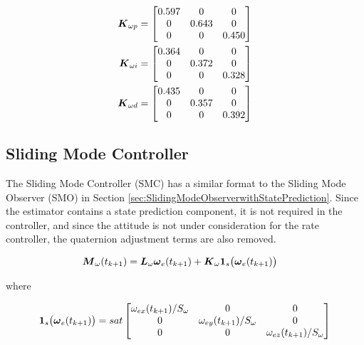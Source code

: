 \begin{subequations}
  \begin{align}
    \boldsymbol{K}_{\omega p} &= \begin{bmatrix} 0.597 & 0 & 0 \\ 0 & 0.643 & 0 \\ 0 & 0 & 0.450 \end{bmatrix} \\
    \boldsymbol{K}_{\omega i} &= \begin{bmatrix} 0.364 & 0 & 0 \\ 0 & 0.372 & 0 \\ 0 & 0 & 0.328 \end{bmatrix} \\
    \boldsymbol{K}_{\omega d} &= \begin{bmatrix} 0.435 & 0 & 0 \\ 0 & 0.357 & 0 \\ 0 & 0 & 0.392 \end{bmatrix}
  \end{align}
  \label{eqn:PIDRateControlGains}
\end{subequations}

\subsection{Sliding Mode Controller}
\label{subsec:SlidingModeController}

The Sliding Mode Controller (SMC) has a similar format to the Sliding Mode Observer (SMO) in Section \ref{sec:SlidingModeObserverwithStatePrediction}.  Since the estimator contains a state prediction component, it is not required in the controller, and since the attitude is not under consideration for the rate controller, the quaternion adjustment terms are also removed.

\begin{subequations}
  \begin{align}
    \boldsymbol{M}_{\omega}(t_{k+1}) &= \boldsymbol{L}_{\omega} \boldsymbol{\omega}_e(t_{k+1}) + \boldsymbol{K}_{\omega}\boldsymbol{1}_s \big(\boldsymbol{\omega}_e(t_{k+1}) \big)
  \end{align}
  \label{eqn:SMOControllerwithPredictionUnforcedMotion}
\end{subequations}

where

\begin{equation}
  \boldsymbol{1}_s \big(\boldsymbol{\omega}_e(t_{k+1}) \big) = sat \begin{bmatrix} \omega_{ex}(t_{k+1}) / S_{\omega} &0 &0 \\ 0 & \omega_{ey}(t_{k+1}) / S_{\omega} & 0 \\ 0 & 0 & \omega_{ez}(t_{k+1}) / S_{\omega} \end{bmatrix}
\end{equation}


